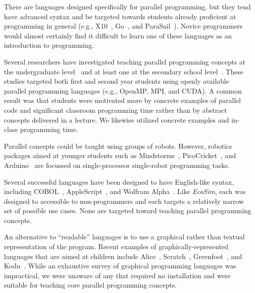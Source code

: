 \documentclass{sig-alternate}
\newcommand{\EcoSim}{\emph{EcoSim}}
\begin{document}
There are languages designed specifically for parallel programming, 
but they tend have advanced syntax 
and be targeted towards students already proficient at programming in general 
(e.g., X10~\cite{X10}, 
Go~\cite{GoLanguage}, and ParaSail~\cite{ParaSail}).  
Novice programmers would almost certainly find it difficult to learn one of these languages
as an introduction to programming.

Several researchers have investigated teaching parallel programming concepts 
at the undergraduate level~\cite{freshmanParallel,undergraduateParallel,gridPortal} 
and at least one at the secondary school level~\cite{highSchoolParallel}.
These studies targeted both first and second year students
using openly available parallel programming languages (e.g., OpenMP, MPI, and CUDA).
A common result was that students were motivated more by 
concrete examples of parallel code and significant classroom programming time 
rather than by abstract concepts delivered in a lecture.
We likewise utilized concrete examples and in-class programming time.


Parallel concepts could be taught using groups of robots.
However, robotics packages aimed at younger students
such as Mindstorms~\cite{Mindstorms}, Pico\-Cricket~\cite{Pico}, and Arduino~\cite{Arduino}
are focussed on single-processor single-robot programming tasks.


Several successful languages have been designed to have English-like syntax,
including COBOL~\cite{COBOL59}, AppleScript~\cite{AppleScript}, and Wolfram Alpha~\cite{WolframAlpha}.
Like \EcoSim{}, each was designed to accessible to non-programmers
and each targets a relatively narrow set of possible use cases.
None are targeted toward teaching parallel programming concepts.

An alternative to ``readable'' languages 
is to use a graphical rather than textual representation of the program.
Recent examples of graphically-represented languages that are aimed at children 
include Alice~\cite{Alice}, Scratch~\cite{Scratch}, Greenfoot~\cite{Greenfoot}, and Kodu~\cite{Kodu}.
While an exhaustive survey of graphical programming languages was impractical,
we were unaware of any that required no installation
and were suitable for teaching core parallel programming concepts.
\end{document}
